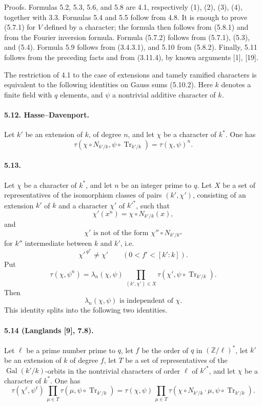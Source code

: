 \documentclass[10pt]{article}
\newcommand{\Gal}{\operatorname{Gal}}
\newcommand{\Tr}{\operatorname{Tr}}
\providecommand{\Gal}{\operatorname{Gal}}
\providecommand{\Gal}{\operatorname{Gal}}
\providecommand{\Tr}{\operatorname{Tr}}
\providecommand{\Gal}{\operatorname{Gal}}
\providecommand{\Tr}{\operatorname{Tr}}
\providecommand{\Gal}{\operatorname{Gal}}
\providecommand{\Tr}{\operatorname{Tr}}
\begin{document}
Proofs. Formulas 5.2, 5.3, 5.6, and 5.8 are 4.1, respectively (1), (2), (3), (4), together with 3.3. Formulas 5.4 and 5.5 follow from 4.8. It is enough to prove (5.7.1) for \(V\) defined by a character; the formula then follows from (5.8.1) and from the Fourier inversion formula. Formula (5.7.2) follows from (5.7.1), (5.3), and (5.4). Formula 5.9 follows from (3.4.3.1), and 5.10 from (5.8.2). Finally, 5.11 follows from the preceding facts and from (3.11.4), by known arguments [1], [19].

The restriction of 4.1 to the case of extensions and tamely ramified characters is equivalent to the following identities on Gauss sums (5.10.2). Here \(k\) denotes a finite field with \(q\) elements, and \(\psi\) a nontrivial additive character of \(k\).

\paragraph{5.12. Hasse--Davenport.} Let \(k'\) be an extension of \(k\), of degree \(n\), and let \(\chi\) be a character of \(k^*\). One has
\[
\tag{5.12.1}
\tau(\chi\circ N_{k'/k},\psi\circ\Tr_{k'/k})
=
\tau(\chi,\psi)^n.
\]

\paragraph{5.13.} Let \(\chi\) be a character of \(k^*\), and let \(n\) be an integer prime to \(q\). Let \(X\) be a set of representatives of the isomorphism classes of pairs \((k',\chi')\), consisting of an extension \(k'\) of \(k\) and a character \(\chi'\) of \(k'^*\), such that
\[
\tag{a}
\chi'(x^n)=\chi\circ N_{k'/k}(x),
\]
and
\[
\tag{b}
\chi'\text{ is not of the form }\chi''\circ N_{k'/k''}
\]
for \(k''\) intermediate between \(k\) and \(k'\), i.e.
\[
\chi'^{\,q^{f'}}\ne\chi'
\qquad(0<f'<[k':k]).
\]
Put
\[
\tau(\chi,\psi^n)=
\lambda_n(\chi,\psi)\,
\prod_{(k',\chi')\in X}
\tau(\chi',\psi\circ\Tr_{k'/k}).
\]
Then
\[
\tag{5.13.1}
\lambda_n(\chi,\psi)\text{ is independent of }\chi.
\]
This identity splits into the following two identities.

\paragraph{5.14 (Langlands [9], 7.8).} Let \(\ell\) be a prime number prime to \(q\), let \(f\) be the order of \(q\) in \((\mathbb Z/\ell)^*\), let \(k'\) be an extension of \(k\) of degree \(f\), let \(T\) be a set of representatives of the \(\Gal(k'/k)\)-orbits in the nontrivial characters of order \(\ell\) of \(k'^*\), and let \(\chi\) be a character of \(k^*\). One has
\[
\tau(\chi^\ell,\psi^\ell)\,
\prod_{\mu\in T}\tau(\mu,\psi\circ\Tr_{k'/k})
=
\tau(\chi,\psi)\,
\prod_{\mu\in T}\tau(\chi\circ N_{k'/k}\cdot\mu,\psi\circ\Tr_{k'/k}).
\]
\end{document}

